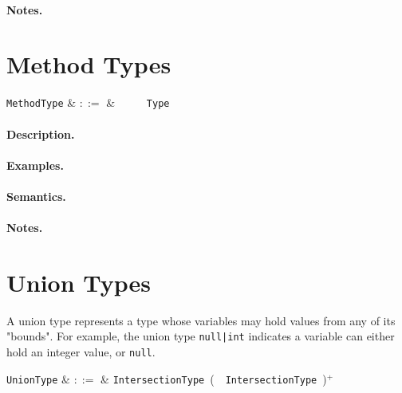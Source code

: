 \paragraph{Notes.}


\section{Method Types}

\begin{syntax}
  \verb+MethodType+ & $::=$ & \ \token{(}\
  \ \token{)}\ \token{=>}\ \verb+Type+\\
\end{syntax}

\paragraph{Description.}  

\paragraph{Examples.}

\paragraph{Semantics.}

\paragraph{Notes.}


\section{Union Types}

A union type represents a type whose variables may hold values from any of its "bounds". For example, the union type \lstinline{null|int} indicates a variable can either hold an integer value, or \lstinline{null}. 

\begin{syntax}
  \verb+UnionType+ & $::=$ & \verb+IntersectionType+\ \big(\ \token{|}\ \verb+IntersectionType+\
  \big)$^+$\\
\end{syntax}

